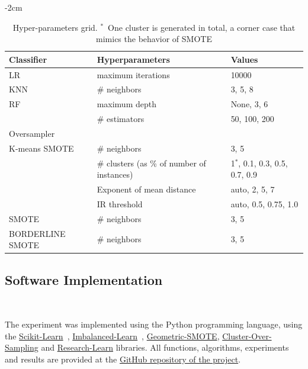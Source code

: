 \documentclass[preprint,12pt]{elsarticle}
\begin{document}
\begin{table}
	\centering
    \addtolength{\leftskip} {-2cm}
    \addtolength{\rightskip}{-2cm}
    \captionsetup{justification=centering}
    \caption{Hyper-parameters grid. $^*$~One cluster is generated in total, a
    corner case that mimics the behavior of SMOTE
    }\label{tab:grid}
    \begin{tabular}{lll}
		\toprule
		Classifier       & Hyperparameters      & Values                            \\
		\midrule
		LR               & maximum iterations   & 10000                             \\
		KNN              & \# neighbors  & {3, 5, 8}                            \\
		RF               & maximum depth        & {None, 3, 6}                      \\
		                 & \# estimators & {50, 100, 200}                         \\
		\toprule
		Oversampler      &                      &                                   \\
		\midrule
        K-means SMOTE    & \# neighbors  & {3, 5}                            \\
		                 & \# clusters (as \% of number of instances)   & {1$^*$, 0.1, 0.3, 0.5, 0.7, 0.9}      \\
                         & Exponent of mean distance & {auto, 2, 5, 7}       \\
                         & IR threshold  & {auto, 0.5, 0.75, 1.0}            \\
		SMOTE            & \# neighbors  & {3, 5}                            \\
		BORDERLINE SMOTE & \# neighbors  & {3, 5}                            \\
		\bottomrule
	\end{tabular}
\end{table}

\subsection{Software Implementation}~\label{sec:implementation}

The experiment was implemented using the Python programming language, using the
\href{https://scikit-learn.org/stable/}{Scikit-Learn}~\cite{Pedregosa2011},
\href{https://imbalanced-learn.org/en/stable/}{Imbalanced-Learn}~\cite{JMLR:v18:16-365},
\href{https://geometric-smote.readthedocs.io/en/latest/?badge=latest}{Geometric-SMOTE},
\href{https://cluster-over-sampling.readthedocs.io/en/latest/?badge=latest}{Cluster-Over-Sampling}
and \href{https://research-learn.readthedocs.io/en/latest/?badge=latest}{Research-Learn} libraries.
All functions, algorithms, experiments and results are provided at the
\href{https://github.com/AlgoWit/publications}{GitHub
repository of the project}.
\end{document}
